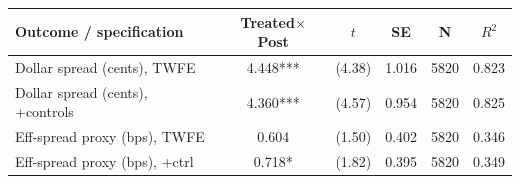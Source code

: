 \begin{tabular}{lccccc}
\toprule
Outcome / specification & Treated$\times$Post & $t$ & SE & N & $R^2$ \\
\midrule
Dollar spread (cents), TWFE & 4.448*** & (4.38) & 1.016 & 5820 & 0.823 \\
Dollar spread (cents), +controls & 4.360*** & (4.57) & 0.954 & 5820 & 0.825 \\
Eff-spread proxy (bps), TWFE & 0.604 & (1.50) & 0.402 & 5820 & 0.346 \\
Eff-spread proxy (bps), +ctrl & 0.718* & (1.82) & 0.395 & 5820 & 0.349 \\
\bottomrule
\end{tabular}